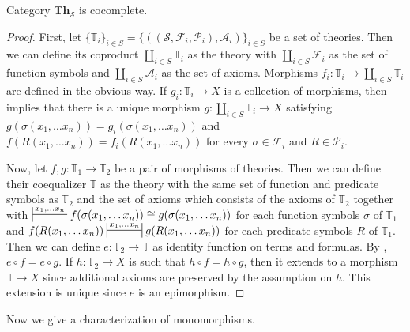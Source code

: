 \documentclass[reqno]{amsart}
\theoremstyle{definition}
\theoremstyle{remark}
\newcommand{\cat}[1]{\mathbf{#1}}
\newcommand{\Th}{\cat{Th}}
\numberwithin{figure}{section}
\begin{document}
\begin{prop}[th-cocomplete]
Category $\Th_\mathcal{S}$ is cocomplete.
\end{prop}
\begin{proof}
First, let $\{ \mathbb{T}_i \}_{i \in S} = \{ ((\mathcal{S},\mathcal{F}_i,\mathcal{P}_i),\mathcal{A}_i) \}_{i \in S}$ be a set of theories.
Then we can define its coproduct $\coprod\limits_{i \in S} \mathbb{T}_i$ as the theory with $\coprod\limits_{i \in S} \mathcal{F}_i$ as the set of function symbols and $\coprod\limits_{i \in S} \mathcal{A}_i$ as the set of axioms.
Morphisms $f_i : \mathbb{T}_i \to \coprod\limits_{i \in S} \mathbb{T}_i$ are defined in the obvious way.
If $g_i : \mathbb{T}_i \to X$ is a collection of morphisms, then  implies that there is a unique morphism $g : \coprod\limits_{i \in S} \mathbb{T}_i \to X$
    satisfying $g(\sigma(x_1, \ldots x_n)) = g_i(\sigma(x_1, \ldots x_n))$ and $f(R(x_1, \ldots x_n)) = f_i(R(x_1, \ldots x_n))$
    for every $\sigma \in \mathcal{F}_i$ and $R \in \mathcal{P}_i$.

Now, let $f,g : \mathbb{T}_1 \to \mathbb{T}_2$ be a pair of morphisms of theories.
Then we can define their coequalizer $\mathbb{T}$ as the theory with the same set of function and predicate symbols as $\mathbb{T}_2$ and the set of axioms which consists of the axioms of $\mathbb{T}_2$
together with $\sststile{}{x_1, \ldots x_n} f(\sigma(x_1, \ldots x_n)) \cong g(\sigma(x_1, \ldots x_n))$ for each function symbols $\sigma$ of $\mathbb{T}_1$
and $f(R(x_1, \ldots x_n)) \ssststile{}{x_1, \ldots x_n} g(R(x_1, \ldots x_n))$ for each predicate symbols $R$ of $\mathbb{T}_1$.
Then we can define $e : \mathbb{T}_2 \to \mathbb{T}$ as identity function on terms and formulas.
By , $e \circ f = e \circ g$.
If $h : \mathbb{T}_2 \to X$ is such that $h \circ f = h \circ g$, then it extends to a morphism $\mathbb{T} \to X$ since additional axioms are preserved by the assumption on $h$.
This extension is unique since $e$ is an epimorphism.
\end{proof}

Now we give a characterization of monomorphisms.
\end{document}
